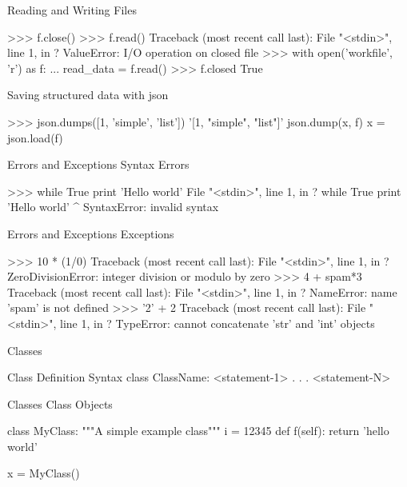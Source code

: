 \documentclass[11pt]{beamer}
\begin{document}
\begin{frame}[containsverbatim]{Reading and Writing Files}
\begin{python}
>>> f.close()
>>> f.read()
Traceback (most recent call last):
  File "<stdin>", line 1, in ?
ValueError: I/O operation on closed file
>>> with open('workfile', 'r') as f:
...    read_data = f.read()
>>> f.closed
True
\end{python}
\end{frame}

\begin{frame}[containsverbatim]{Saving structured data with json}
\begin{python}
>>> json.dumps([1, 'simple', 'list'])
'[1, "simple", "list"]'
json.dump(x, f)
x = json.load(f)
\end{python}
\end{frame}


\begin{frame}[containsverbatim]{Errors and Exceptions}
Syntax Errors
\begin{python}
>>> while True print 'Hello world'
  File "<stdin>", line 1, in ?
    while True print 'Hello world'
                   ^
SyntaxError: invalid syntax
\end{python}
\end{frame}


\begin{frame}[containsverbatim]{Errors and Exceptions}
Exceptions
\begin{python}
>>> 10 * (1/0)
Traceback (most recent call last):
  File "<stdin>", line 1, in ?
ZeroDivisionError: integer division or modulo by zero
>>> 4 + spam*3
Traceback (most recent call last):
  File "<stdin>", line 1, in ?
NameError: name 'spam' is not defined
>>> '2' + 2
Traceback (most recent call last):
  File "<stdin>", line 1, in ?
TypeError: cannot concatenate 'str' and 'int' objects
\end{python}
\end{frame}

\begin{frame}[containsverbatim]{Classes}
\begin{python}
Class Definition Syntax
class ClassName:
    <statement-1>
    .
    .
    .
    <statement-N>
\end{python}
\end{frame}

\begin{frame}[containsverbatim]{Classes}
Class Objects
\begin{python}
class MyClass:
    """A simple example class"""
    i = 12345
    def f(self):
        return 'hello world'

x = MyClass()

\end{python}
\end{frame}
\end{document}
